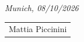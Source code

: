 \vspace{1cm}
\noindent \textit{Munich, 08/10/2026}

\vspace{0.2cm}
\begin{flushright}
\begin{tabular}{m{5cm}}
\\ \hline
\centering Mattia Piccinini \\
\end{tabular}
\end{flushright}